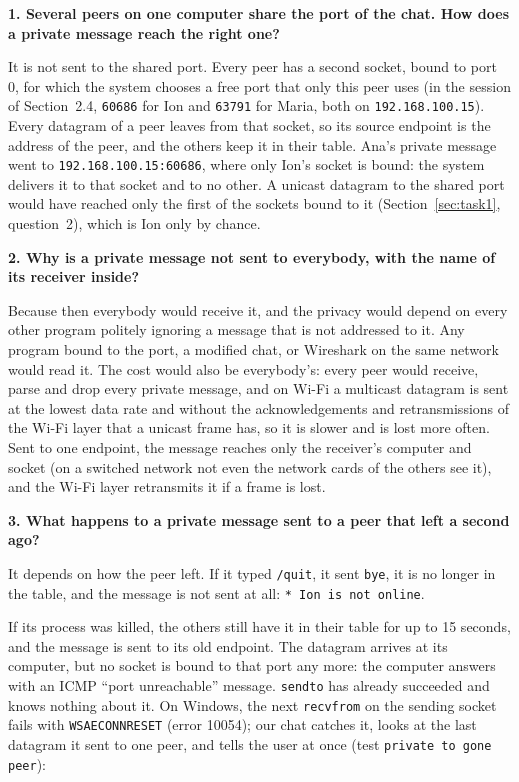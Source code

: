 \documentclass[11pt,a4paper]{article}
\newcommand{\question}[1]{\par\medskip\textbf{#1}\par}
\newcommand{\code}[1]{{\frenchspacing\texttt{#1}}}
\begin{document}
\question{1. Several peers on one computer share the port of the chat. How does a private message
reach the right one?}

It is not sent to the shared port. Every peer has a second socket, bound to port 0, for which the
system chooses a free port that only this peer uses (in the session of Section~2.4, \code{60686}
for Ion and \code{63791} for Maria, both on \code{192.168.100.15}). Every datagram of a peer leaves
from that socket, so its source endpoint is the address of the peer, and the others keep it in their
table. Ana's private message went to \code{192.168.100.15:60686}, where only Ion's socket is bound: the
system delivers it to that socket and to no other. A unicast datagram to the shared port would have
reached only the first of the sockets bound to it (Section~\ref{sec:task1}, question~2), which is
Ion only by chance.

\question{2. Why is a private message not sent to everybody, with the name of its receiver inside?}

Because then everybody would receive it, and the privacy would depend on every other program
politely ignoring a message that is not addressed to it. Any program bound to the port, a modified
chat, or Wireshark on the same network would read it. The cost would also be everybody's: every
peer would receive, parse and drop every private message, and on Wi-Fi a multicast datagram is sent
at the lowest data rate and without the acknowledgements and retransmissions of the Wi-Fi layer that
a unicast frame has, so it is slower and is lost more often. Sent to one endpoint, the message
reaches only the receiver's computer and socket (on a switched network not even the network cards of
the others see it), and the Wi-Fi layer retransmits it if a frame is lost.

\question{3. What happens to a private message sent to a peer that left a second ago?}

It depends on how the peer left. If it typed \code{/quit}, it sent \code{bye}, it is no longer in
the table, and the message is not sent at all: \code{* Ion is not online}.

If its process was killed, the others still have it in their table for up to 15 seconds, and the
message is sent to its old endpoint. The datagram arrives at its computer, but no socket is bound to
that port any more: the computer answers with an ICMP ``port unreachable'' message. \code{sendto}
has already succeeded and knows nothing about it. On Windows, the next \code{recvfrom} on the
sending socket fails with \code{WSAECONNRESET} (error 10054); our chat catches it, looks at the last
datagram it sent to one peer, and tells the user at once (test \code{private to gone peer}):
\end{document}
